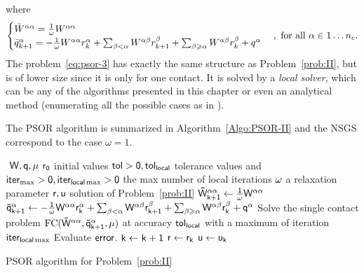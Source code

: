 where
\begin{equation}
  \label{eq:psor-2}
  \begin{cases}
    \Bar W^{\alpha\alpha} = \frac 1 \omega W^{\alpha\alpha} \\
    \bar q^{\alpha}_{k+1} = - \frac 1 \omega W^{\alpha\alpha} r^{\alpha}_{k}
    + \sum_{\beta < \alpha}W^{\alpha\beta} r^{\beta}_{k+1} + \sum_{\beta
      \geq \alpha}W^{\alpha\beta} r^{\beta}_{k} + q^\alpha
  \end{cases}
, \text{ for all } \alpha \in 1\ldots n_c.
\end{equation}
The problem~\eqref{eq:psor-3} has exactly the same structure as Problem~\ref{prob:II}, but is of lower size since it is only for one contact.
It is solved by a \emph{local solver}, which can be any of the algorithms presented in this chapter or even an analytical method (enumerating all the possible cases as in \citep{bonnefon:inria-00553859}).


The PSOR algorithm is summarized in Algorithm~\ref{Algo:PSOR-II} and the NSGS correspond to the case $\omega=1$.
%
\begin{algorithm}
  \begin{algorithmic}
    {\sf
      \STATE $ $ 
      \REQUIRE $\sf W,q,\mu$
      \REQUIRE $\sf r_0$ initial values
      \REQUIRE $\sf tol >0, tol_{{local }}$  tolerance values and $\sf iter_{\max}  >0, \sf iter_{local \max}  >0$ the max number of local iterations
      \REQUIRE $\sf \omega$ a relaxation parameter 
      \ENSURE  $\sf r,u$ solution of Problem~\ref{prob:II}
      \STATE $\sf \bar W^{\alpha\alpha}_{k+1} \leftarrow  \frac 1 \omega W^{\alpha\alpha}$
      \STATE $\sf   \bar q^{\alpha}_{k+1} \leftarrow - \frac 1 \omega W^{\alpha\alpha} r^{\alpha}_{k}
      + \sum_{\beta < \alpha}W^{\alpha\beta} r^{\beta}_{k+1} + \sum_{\beta
        \geq \alpha}W^{\alpha\beta} r^{\beta}_{k} + q^\alpha $
      \STATE Solve the single contact problem $\sf \mathrm{FC}(\bar W^{\alpha\alpha},\bar q^{\alpha}_{k+1},\mu)$ at accuracy $\sf tol_{{local }}$ with a maximum of iteration $\sf iter_{local \max}$
      \ENDFOR
      \STATE Evaluate $\sf error$.
      \STATE $\sf k \leftarrow k+1$ 
      \ENDWHILE
      \STATE $\sf r \leftarrow r_{k}$ 
      \STATE $\sf u \leftarrow u_{k}$ 
    }
  \end{algorithmic}
  \caption{PSOR algorithm for Problem~\ref{prob:II}}  \label{Algo:PSOR-II}
\end{algorithm}

